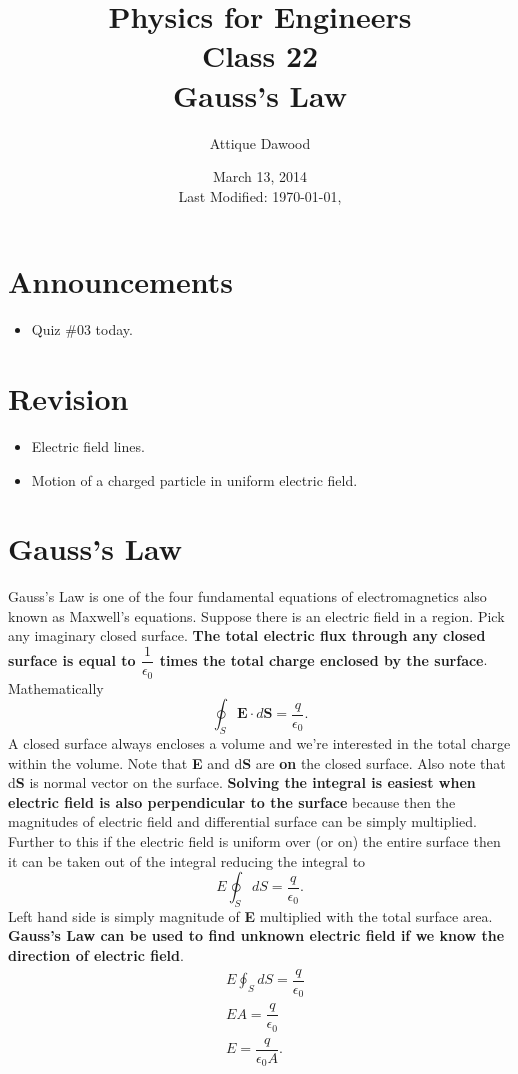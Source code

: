 \documentclass[12pt,a4paper]{article}
\title{\vspace{-3cm}Physics for Engineers\\Class 22\\Gauss's Law}
\author{Attique Dawood}
\date{March 13, 2014\\[0.2cm] Last Modified: \today, \currenttime}
\begin{document}
\maketitle
\section{Announcements}
\begin{itemize}
\item Quiz \#03 today.
\end{itemize}
\section{Revision}
\begin{itemize}
\item Electric field lines.
\item Motion of a charged particle in uniform electric field.
\end{itemize}
\section{Gauss's Law}
Gauss's Law is one of the four fundamental equations of electromagnetics also known as Maxwell's equations. Suppose there is an electric field in a region. Pick any imaginary closed surface. \textbf{The total electric flux through any closed surface is equal to $\dfrac{1}{\epsilon_0}$ times the total charge enclosed by the surface}. Mathematically
\begin{equation}
\oint_{S}\textbf{E}\cdot d\textbf{S}=\dfrac{q}{\epsilon_0}.
\end{equation}
A closed surface always encloses a volume and we're interested in the total charge within the volume. Note that \textbf{E} and d\textbf{S} are \textbf{on} the closed surface. Also note that d\textbf{S} is normal vector on the surface. \textbf{Solving the integral is easiest when electric field is also perpendicular to the surface} because then the magnitudes of electric field and differential surface can be simply multiplied. Further to this if the electric field is uniform over (or on) the entire surface then it can be taken out of the integral reducing the integral to
\begin{equation}
E\oint_{S}dS=\dfrac{q}{\epsilon_0}.
\end{equation}
Left hand side is simply magnitude of \textbf{E} multiplied with the total surface area. \textbf{Gauss's Law can be used to find unknown electric field if we know the direction of electric field}.
\begin{equation}
\begin{split}
&E\oint_{S}dS=\dfrac{q}{\epsilon_0}\\
&EA=\dfrac{q}{\epsilon_0}\\
&E=\dfrac{q}{\epsilon_0A}.
\end{split}
\end{equation}
\end{document}
